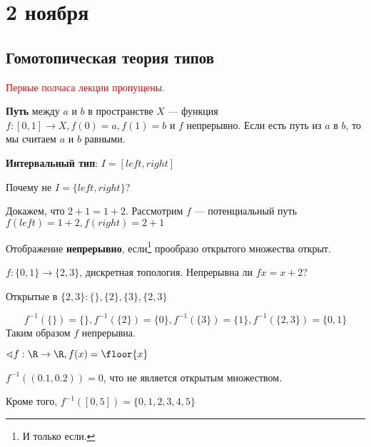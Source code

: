 \chapter{2 ноября}

\section{Гомотопическая теория типов}

\textcolor{red}{Первые полчаса лекции пропущены.}

\begin{definition}
    \textbf{Путь} между \(a\) и \(b\) в пространстве \(X\) --- функция \(f : [0, 1] \to X, f(0) = a, f(1) = b\) и \(f\) непрерывно. Если есть путь из \(a\) в \(b\), то мы считаем \(a\) и \(b\) равными.
\end{definition}

\begin{definition}
    \textbf{Интервальный тип}: \(I = [left, right]\)
\end{definition}

Почему не \(I = \{left, right\}\)?

\begin{example}
    Докажем, что \(2 + 1 = 1 + 2\). Рассмотрим \(f\) --- потенциальный путь \(f(left) = 1 + 2, f(right) = 2 + 1\)
\end{example}

\begin{definition}
    Отображение \textbf{непрерывно}, если\footnote{И только если.} прообразо открытого множества открыт.
\end{definition}

\begin{example}
    \(f : \{0, 1\} \to \{2, 3\}\), дискретная топология. Непрерывна ли \(f x = x + 2\)?

    Открытые в \(\{2, 3\} : \{\}, \{2\}, \{3\}, \{2, 3\}\)

    \[f^{-1}(\{\}) = \{\}, f^{-1}(\{2\}) = \{0\}, f^{-1}(\{3\}) = \{1\}, f^{-1}(\{2, 3\}) = \{0, 1\}\]
    Таким образом \(f\) непрерывна.
\end{example}

\begin{example}
    \(\sphericalangle f : \R \to \R, f(x) = \floor{x}\)

    \(f^{-1}((0.1, 0.2)) = 0\), что не является открытым множеством.

    Кроме того, \(f^{-1}([0, 5]) = \{0,1,2,3,4,5\}\)
\end{example}

